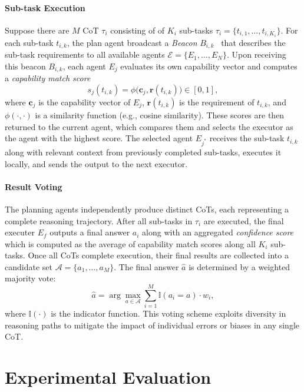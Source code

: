 \documentclass{article}
\begin{document}
\paragraph{Sub-task Execution}
Suppose there are $M$ CoT $\tau_i$ consisting of of $K_i$ sub-tasks 
$\tau_i = \{t_{i,1}, \dots, t_{i,K_i}\}$. For each sub-task $t_{i,k}$, the plan agent broadcast a \textit{Beacon} $B_{i,k}$~\cite{beacon_distributed_systems} that describes the sub-task requirements to all available agents $\mathcal{E} = \{E_1, \dots, E_N\}$. Upon receiving this beacon $B_{i,k}$, each agent $E_j$ evaluates its own capability vector and computes a \emph{capability match score}
\begin{equation}
    s_{j}(t_{i,k}) = \phi \big( \mathbf{c}_j, \mathbf{r}(t_{i,k}) \big) \in [0,1],
\end{equation}
where $\mathbf{c}_j$ is the capability vector of $E_j$,  
$\mathbf{r}(t_{i,k})$ is the requirement of $t_{i,k}$,  
and $\phi(\cdot,\cdot)$ is a similarity function (e.g., cosine similarity). These scores are then returned to the current agent, which compares them and selects the executor as the agent with the highest score. The selected agent $E_{j^\ast}$ receives the sub-task $t_{i,k}$ along with relevant context from previously completed sub-tasks, executes it locally, and sends the output to the next executor.

\paragraph{Result Voting}
The planning agents independently produce distinct CoTs, each representing a complete reasoning trajectory. After all sub-tasks in $\tau_i$ are executed, the final executer $E_{f}$ outputs a final answer $a_i$ along with an aggregated \emph{confidence score} which is computed as the average of capability match scores along all $K_i$ sub-tasks. Once all CoTs complete execution, their final results are collected into a candidate set $\mathcal{A} = \{a_1, \dots, a_M\}$.  
The final answer $\hat{a}$ is determined by a weighted majority vote:
\begin{equation}
    \hat{a} = \arg\max_{a \in \mathcal{A}} \sum_{i=1}^M \mathbb{I}(a_i = a) \cdot w_i,
\end{equation}
where $\mathbb{I}(\cdot)$ is the indicator function. This voting scheme exploits diversity in reasoning paths to mitigate the impact of individual errors or biases in any single CoT.

\section{Experimental Evaluation}
\end{document}
